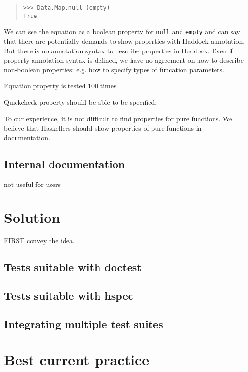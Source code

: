 \documentclass[preprint]{sigplanconf}
\begin{document}
\begin{quote}
\begin{verbatim}
>>> Data.Map.null (empty)
True
\end{verbatim}
\end{quote}

We can see the equation as a boolean property for {\tt null} and {\tt empty} and
can say that there are potentially demands to show properties with Haddock annotation.
But there is no annotation syntax to describe properties in Haddock.
Even if property annotation syntax is defined, 
we have no agreement on how to describe non-boolean properties: e.g. how to specify types of funcation parameters.

Equation property is tested 100 times.

Quickcheck property should be able to be specified.

To our experience, it is not difficult to find properties for pure functions.
We believe that Haskellers should show properties of pure functions
in documentation.

\subsection{Internal documentation}

not useful for users

\section{Solution}

FIRST convey the idea.

\subsection{Tests suitable with doctest}

\subsection{Tests suitable with hspec}

\subsection{Integrating multiple test suites}

\section{Best current practice}
\end{document}
